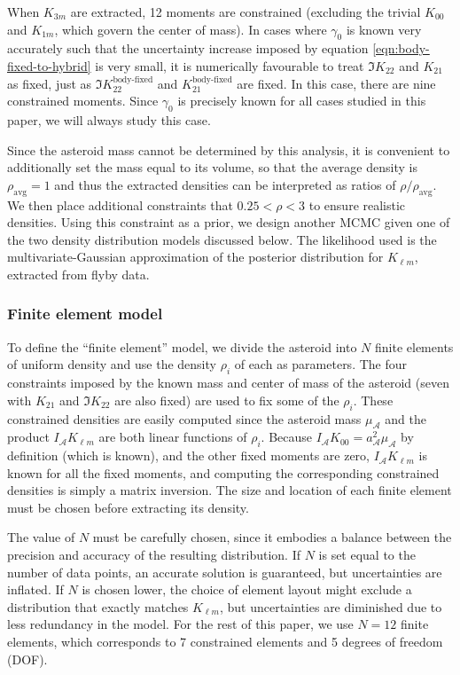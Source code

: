\documentclass[fleqn,usenatbib]{mnras}
\begin{document}
When $K_{3m}$ are extracted, 12 moments are constrained (excluding the trivial $K_{00}$ and $K_{1m}$, which govern the center of mass). In cases where $\gamma_0$ is known very accurately such that the uncertainty increase imposed by equation \ref{eqn:body-fixed-to-hybrid} is very small, it is numerically favourable to treat $\Im K_{22}$ and $K_{21}$ as fixed, just as $\Im K_{22}^\text{body-fixed}$ and $K_{21}^\text{body-fixed}$ are fixed. In this case, there are nine constrained moments. Since $\gamma_0$ is precisely known for all cases studied in this paper, we will always study this case.

Since the asteroid mass cannot be determined by this analysis, it is convenient to additionally set the mass equal to its volume, so that the average density is $\rho_\text{avg}=1$ and thus the extracted densities can be interpreted as ratios of $\rho / \rho_\text{avg}$. We then place additional constraints that $0.25 < \rho < 3$ to ensure realistic densities. Using this constraint as a prior, we design another MCMC given one of the two density distribution models discussed below. The likelihood used is the multivariate-Gaussian approximation of the posterior distribution for $K_{\ell m}$, extracted from flyby data.



\subsubsection{Finite element model}

To define the ``finite element'' model, we divide the asteroid into $N$ finite elements of uniform density and use the density $\rho_i$ of each as parameters. The four constraints imposed by the known mass and center of mass of the asteroid (seven with $K_{21}$ and $\Im K_{22}$ are also fixed) are used to fix some of the $\rho_i$. These constrained densities are easily computed since the asteroid mass $\mu_\mathcal{A}$ and the product $I_\mathcal{A}K_{\ell m}$ are both linear functions of $\rho_i$. Because $I_\mathcal{A}K_{00} = a_\mathcal{A}^2\mu_\mathcal{A}$ by definition (which is known), and the other fixed moments are zero, $I_\mathcal{A} K_{\ell m}$ is known for all the fixed moments, and computing the corresponding constrained densities is simply a matrix inversion. The size and location of each finite element must be chosen before extracting its density.

The value of $N$ must be carefully chosen, since it embodies a balance between the precision and accuracy of the resulting distribution. If $N$ is set equal to the number of data points, an accurate solution is guaranteed, but uncertainties are inflated. If $N$ is chosen lower, the choice of element layout might exclude a distribution that exactly matches $K_{\ell m}$, but uncertainties are diminished due to less redundancy in the model. For the rest of this paper, we use $N=12$ finite elements, which corresponds to 7 constrained elements and 5 degrees of freedom (DOF).
\end{document}
